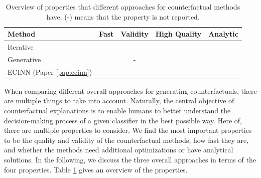 \documentclass[11pt,a4paper,twoside,openright,final]{memoir}
\newcommand{\cmark}{\ding{51}}%
\newcommand{\xmark}{\ding{55}}%
\newcommand{\greencheck}{\textcolor{green}{\cmark}}
\newcommand{\redcross}{\textcolor{red}{\xmark}}
\newcommand*{\paperref}[1]{Paper \hyperref[#1]{\ref{#1}}}
\begin{document}
\begin{table}[b]
    \centering
    \begin{tabular}{lcccc}
    \toprule
        \textbf{Method}                                                 & \textbf{Fast}    & \textbf{Validity} & \textbf{High Quality}   & \textbf{Analytic}         \\
    \midrule                                                              
        Iterative \cite{Wachter2017, Dhurandhar2018, VanLooveren2019}   & \redcross        & \redcross         &  \redcross             & \redcross                 \\
        Generative \cite{Joshi2018, Rodriguez2021, Singla2019, flowcounterfactuals}  & \greencheck      & -                 &  \greencheck           & \redcross                 \\
        ECINN (\paperref{pap:ecinn})                                    & \greencheck      & \greencheck       &  \greencheck           & \greencheck               \\
    \bottomrule
    \end{tabular}
    \caption{Overview of properties that different approaches for counterfactual methods have. (-) means that the property is not reported.}
    \label{tab:cf-method-comparison}
\end{table}

When comparing different overall approaches for generating counterfactuals, there are multiple things to take into account.
Naturally, the central objective of counterfactual explanations is to enable humans to better understand the decision-making process of a given classifier in the best possible way.
Here of, there are multiple properties to consider.
We find the most important properties to be the quality and validity of the counterfactual methods, how fast they are, and whether the methods need additional optimizations or have analytical solutions.
In the following, we discuss the three overall approaches in terms of the four properties.
Table \ref{tab:cf-method-comparison} gives an overview of the properties.
\end{document}
